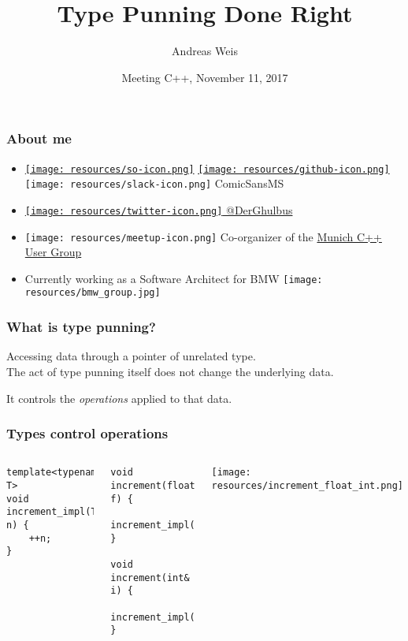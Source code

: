 \documentclass[aspectratio=169]{beamer}
\title{Type Punning Done Right}
\author{Andreas Weis}
\institute{BMW AG}
\date{Meeting C++, November 11, 2017}
\newif\iftransitions
\begin{document}
\frame{\titlepage}

\begin{frame}[fragile]
  \frametitle{About me}

  \begin{itemize}
    \setlength\itemsep{1.5em}

    \item \href{https://stackoverflow.com/users/577603/comicsansms}{\texttt{[image: resources/so-icon.png]}} \href{https://github.com/ComicSansMS}{\texttt{[image: resources/github-icon.png]}} \texttt{[image: resources/slack-icon.png]} ComicSansMS

    \item \href{https://twitter.com/DerGhulbus/}{\texttt{[image: resources/twitter-icon.png]} @DerGhulbus}

    \item \texttt{[image: resources/meetup-icon.png]} Co-organizer of the \href{https://www.meetup.com/MUCplusplus/}{Munich C++ User Group}

    \item Currently working as a Software Architect for BMW \texttt{[image: resources/bmw\_group.jpg]}

  \end{itemize}
\end{frame}


\begin{frame}[fragile]
  \frametitle{What is type punning?}

  \iftransitions \pause \fi

  Accessing data through a pointer of unrelated type. \\[2ex]

  \iftransitions \pause \fi
   
  The act of type punning itself does not change the underlying data.
  
  It controls the \emph{operations} applied to that data.
\end{frame}


\begin{frame}[fragile]
  \frametitle{Types control operations}
  \setlength{\tabcolsep}{12pt}
  \begin{columns}
 
    \begin{lstlisting}
template<typename T>
void increment_impl(T& n) {
    ++n;
}
    \end{lstlisting}
    \iftransitions \pause \fi
    \begin{lstlisting}
void increment(float& f) {
    increment_impl(f);
}

void increment(int& i) {
    increment_impl(i);
}
    \end{lstlisting}
    \iftransitions \pause \fi
    \texttt{[image: resources/increment\_float\_int.png]}
  \end{columns}
\end{frame}
\end{document}
